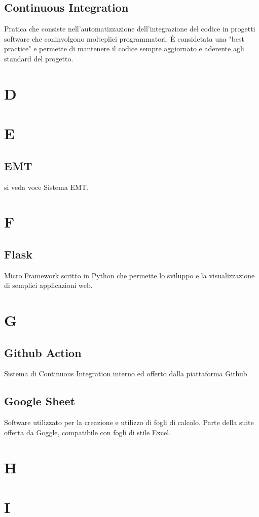 \subsection{Continuous Integration}
Pratica che consiste nell'automatizzazione dell'integrazione del codice in progetti software che coninvolgono
molteplici programmatori. È considetata una "best practice" e permette di mantenere il codice sempre aggiornato e 
aderente agli standard del progetto.
\newpage
\section{D}
\section{E}
\subsection{EMT}
si veda voce Sistema EMT.
\newpage
\section{F}
\subsection{Flask}
Micro Framework scritto in Python che permette lo sviluppo e la visualizzazione di semplici applicazioni web.
\newpage
\section{G}
\subsection{Github Action}
Sistema di Continuous Integration interno ed offerto dalla piattaforma Github.
\subsection{Google Sheet}
Software utilizzato per la creazione e utilizzo di fogli di calcolo. Parte della suite offerta da Goggle, compatibile con fogli di stile Excel.
\newpage
\section{H}
\section{I}
